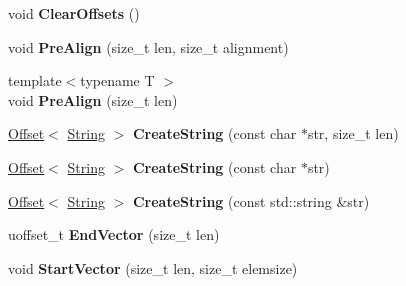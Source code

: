 \begin{DoxyCompactItemize}
void {\bfseries Clear\+Offsets} ()
\item 
\mbox{\label{classflatbuffers_1_1FlatBufferBuilder_a8f78d3fb4d0eedbcb5050cd27c9b8209}} 
void {\bfseries Pre\+Align} (size\+\_\+t len, size\+\_\+t alignment)
\item 
\mbox{\label{classflatbuffers_1_1FlatBufferBuilder_a64386b3e5421e0da124e752a905125e1}} 
{\footnotesize template$<$typename T $>$ }\\void {\bfseries Pre\+Align} (size\+\_\+t len)
\item 
\mbox{\label{classflatbuffers_1_1FlatBufferBuilder_aec6f9df2a0366b540b24822414d92cbe}} 
\hyperlink{structflatbuffers_1_1Offset}{Offset}$<$ \hyperlink{structflatbuffers_1_1String}{String} $>$ {\bfseries Create\+String} (const char $\ast$str, size\+\_\+t len)
\item 
\mbox{\label{classflatbuffers_1_1FlatBufferBuilder_aad93d113ac24e86ed04b5236b3f4c0c5}} 
\hyperlink{structflatbuffers_1_1Offset}{Offset}$<$ \hyperlink{structflatbuffers_1_1String}{String} $>$ {\bfseries Create\+String} (const char $\ast$str)
\item 
\mbox{\label{classflatbuffers_1_1FlatBufferBuilder_a8c3af55e64f5cda9aefa38ac5287ef9f}} 
\hyperlink{structflatbuffers_1_1Offset}{Offset}$<$ \hyperlink{structflatbuffers_1_1String}{String} $>$ {\bfseries Create\+String} (const std\+::string \&str)
\item 
\mbox{\label{classflatbuffers_1_1FlatBufferBuilder_ad5231e785a762f7f92e20d6de57c90ee}} 
uoffset\+\_\+t {\bfseries End\+Vector} (size\+\_\+t len)
\item 
\mbox{\label{classflatbuffers_1_1FlatBufferBuilder_aff03c4fcf880a81f1b09a14242d71af6}} 
void {\bfseries Start\+Vector} (size\+\_\+t len, size\+\_\+t elemsize)
\item 
\mbox{\label{classflatbuffers_1_1FlatBufferBuilder_ad1d108ffdc0592792c17aa3c36f69bdd}} 

\end{DoxyCompactItemize}
